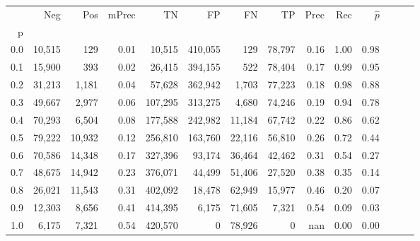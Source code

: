 \begin{tabular}{rrrrrrrrrrrrrr}
\toprule
{} &     Neg &     Pos & mPrec &       TN &       FP &      FN &      TP &  Prec &   Rec & $\hat{p}$ \\
p   &         &         &       &          &          &         &         &       &       &           \\
\midrule
0.0 &  10,515 &     129 &  0.01 &   10,515 &  410,055 &     129 &  78,797 &  0.16 &  1.00 &      0.98 \\
0.1 &  15,900 &     393 &  0.02 &   26,415 &  394,155 &     522 &  78,404 &  0.17 &  0.99 &      0.95 \\
0.2 &  31,213 &   1,181 &  0.04 &   57,628 &  362,942 &   1,703 &  77,223 &  0.18 &  0.98 &      0.88 \\
0.3 &  49,667 &   2,977 &  0.06 &  107,295 &  313,275 &   4,680 &  74,246 &  0.19 &  0.94 &      0.78 \\
0.4 &  70,293 &   6,504 &  0.08 &  177,588 &  242,982 &  11,184 &  67,742 &  0.22 &  0.86 &      0.62 \\
0.5 &  79,222 &  10,932 &  0.12 &  256,810 &  163,760 &  22,116 &  56,810 &  0.26 &  0.72 &      0.44 \\
0.6 &  70,586 &  14,348 &  0.17 &  327,396 &   93,174 &  36,464 &  42,462 &  0.31 &  0.54 &      0.27 \\
0.7 &  48,675 &  14,942 &  0.23 &  376,071 &   44,499 &  51,406 &  27,520 &  0.38 &  0.35 &      0.14 \\
0.8 &  26,021 &  11,543 &  0.31 &  402,092 &   18,478 &  62,949 &  15,977 &  0.46 &  0.20 &      0.07 \\
0.9 &  12,303 &   8,656 &  0.41 &  414,395 &    6,175 &  71,605 &   7,321 &  0.54 &  0.09 &      0.03 \\
1.0 &   6,175 &   7,321 &  0.54 &  420,570 &        0 &  78,926 &       0 &   nan &  0.00 &      0.00 \\
\bottomrule
\end{tabular}
